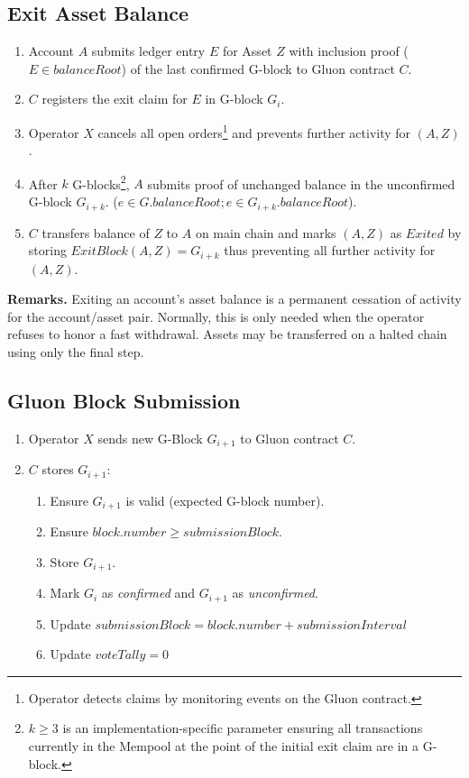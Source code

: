 \documentclass[12pt,a4paper]{article}
\begin{document}
\subsection{Exit Asset Balance}\label{gp:exit}
\begin{mdframed}
\begin{enumerate}
    \item Account $A$ submits ledger entry $E$ for Asset $Z$ with inclusion proof (\(E \in balanceRoot\)) of the last confirmed G-block to Gluon contract $C$.
    \item $C$ registers the exit claim for $E$ in G-block $G_i$.
    \item Operator $X$ cancels all open orders\footnote{Operator detects claims by monitoring events on the Gluon contract.} and prevents further activity for \((A, Z)\).
    \item After $k$ G-blocks\footnote{\(k \geq 3\) is an implementation-specific parameter ensuring all transactions currently in the Mempool at the point of the initial exit claim are in a G-block.}, $A$ submits proof  of unchanged balance in the unconfirmed G-block $G_{i+k}$. (\(e \in G.balanceRoot; e \in G_{i+k}.balanceRoot\)).
    \item $C$ transfers balance of $Z$ to $A$ on main chain and marks \((A,Z)\) as $Exited$ by storing \(ExitBlock(A, Z) = G_{i+k}\) thus preventing all further activity for \((A, Z)\).
\end{enumerate}
\end{mdframed}


\textbf{Remarks.}  Exiting an account’s asset balance is a permanent cessation of activity for the account/asset pair. Normally, this is only needed when the operator refuses to honor a fast withdrawal.  Assets may be transferred on a halted chain using only the final step.

\subsection{Gluon Block Submission}\label{gp:block}
\begin{mdframed}
\begin{enumerate}
    \item Operator $X$ sends new G-Block $G_{i+1}$ to Gluon contract $C$.
    \item $C$ stores $G_{i+1}$:
    \begin{enumerate}
        \item Ensure $G_{i+1}$ is valid (expected G-block number).
        \item Ensure \(block.number \geq submissionBlock \).
        \item Store $G_{i+1}$.
        \item Mark $G_i$ as \emph{confirmed} and $G_{i+1}$ as \emph{unconfirmed}.
        \item Update \(submissionBlock = block.number + submissionInterval\)
        \item Update \(voteTally = 0\)
    \end{enumerate}
\end{enumerate}
\end{mdframed}
\end{document}
